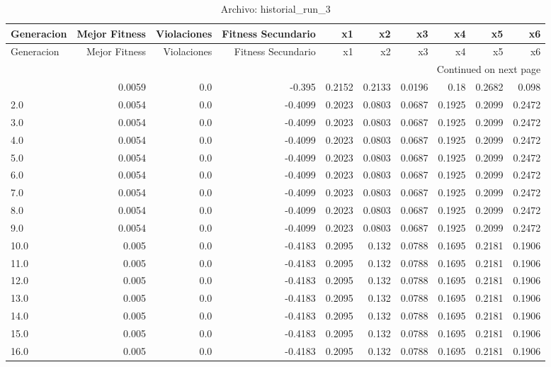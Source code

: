 \begin{longtable}{lrrrrrrrrr}
\caption{Archivo: historial\_run\_3}\label{tab:historial_run_3} \\
\toprule
Generacion & Mejor Fitness & Violaciones & Fitness Secundario & x1 & x2 & x3 & x4 & x5 & x6 \\
\midrule
\endfirsthead
\toprule
Generacion & Mejor Fitness & Violaciones & Fitness Secundario & x1 & x2 & x3 & x4 & x5 & x6 \\
\midrule
\endhead
\midrule
\multicolumn{10}{r}{Continued on next page} \\
\midrule
\endfoot
\bottomrule
\endlastfoot
1.0 & 0.0059 & 0.0 & -0.395 & 0.2152 & 0.2133 & 0.0196 & 0.18 & 0.2682 & 0.098 \\
2.0 & 0.0054 & 0.0 & -0.4099 & 0.2023 & 0.0803 & 0.0687 & 0.1925 & 0.2099 & 0.2472 \\
3.0 & 0.0054 & 0.0 & -0.4099 & 0.2023 & 0.0803 & 0.0687 & 0.1925 & 0.2099 & 0.2472 \\
4.0 & 0.0054 & 0.0 & -0.4099 & 0.2023 & 0.0803 & 0.0687 & 0.1925 & 0.2099 & 0.2472 \\
5.0 & 0.0054 & 0.0 & -0.4099 & 0.2023 & 0.0803 & 0.0687 & 0.1925 & 0.2099 & 0.2472 \\
6.0 & 0.0054 & 0.0 & -0.4099 & 0.2023 & 0.0803 & 0.0687 & 0.1925 & 0.2099 & 0.2472 \\
7.0 & 0.0054 & 0.0 & -0.4099 & 0.2023 & 0.0803 & 0.0687 & 0.1925 & 0.2099 & 0.2472 \\
8.0 & 0.0054 & 0.0 & -0.4099 & 0.2023 & 0.0803 & 0.0687 & 0.1925 & 0.2099 & 0.2472 \\
9.0 & 0.0054 & 0.0 & -0.4099 & 0.2023 & 0.0803 & 0.0687 & 0.1925 & 0.2099 & 0.2472 \\
10.0 & 0.005 & 0.0 & -0.4183 & 0.2095 & 0.132 & 0.0788 & 0.1695 & 0.2181 & 0.1906 \\
11.0 & 0.005 & 0.0 & -0.4183 & 0.2095 & 0.132 & 0.0788 & 0.1695 & 0.2181 & 0.1906 \\
12.0 & 0.005 & 0.0 & -0.4183 & 0.2095 & 0.132 & 0.0788 & 0.1695 & 0.2181 & 0.1906 \\
13.0 & 0.005 & 0.0 & -0.4183 & 0.2095 & 0.132 & 0.0788 & 0.1695 & 0.2181 & 0.1906 \\
14.0 & 0.005 & 0.0 & -0.4183 & 0.2095 & 0.132 & 0.0788 & 0.1695 & 0.2181 & 0.1906 \\
15.0 & 0.005 & 0.0 & -0.4183 & 0.2095 & 0.132 & 0.0788 & 0.1695 & 0.2181 & 0.1906 \\
16.0 & 0.005 & 0.0 & -0.4183 & 0.2095 & 0.132 & 0.0788 & 0.1695 & 0.2181 & 0.1906 \\

\end{longtable}
